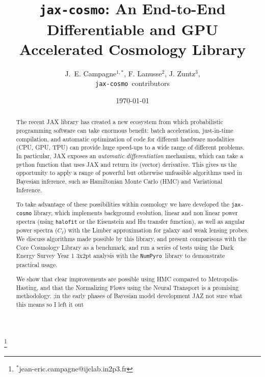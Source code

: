\documentclass[twocolumn,twocolappendix,nofootinbib]{openjournal}
\newcommand{\numpyro}{\texttt{NumPyro}}
\newcommand{\jaxcosmo}{\texttt{jax-cosmo}}
\begin{document}


\title{\jaxcosmo: An End-to-End Differentiable and GPU Accelerated Cosmology Library}


\author{
J.~E. Campagne$^{1,\ast}$, 
F. Lanusse$^2$, 
J. Zuntz$^3$,\\
\jaxcosmo\ contributors}
\thanks{$^\ast$jean-eric.campagne@ijclab.in2p3.fr}


\date{\today}

\begin{abstract}
The recent JAX library has created a new ecosystem from which probabilistic programming software can take enormous benefit: batch acceleration, just-in-time compilation, and automatic optimization of code for different hardware modalities (CPU, GPU, TPU) can provide huge speed-ups to a wide range of different problems. In particular, JAX exposes an \textit{automatic differentiation} mechanism, which can take a python function that uses JAX and return its (vector) derivative.  This gives us the opportunity to apply a range of powerful but otherwise unfeasible algorithms used in Bayesian inference, such as Hamiltonian Monte Carlo (HMC) and Variational Inference. 

To take advantage of these possibilities within cosmology we have developed the \texttt{jax-cosmo} library, which implements background evolution, linear and non linear power spectra (using \texttt{halofit} or the Eisenstein and Hu transfer function), as well as angular power spectra ($C_\ell$) with the Limber approximation for galaxy and weak lensing probes. We discuss algorithms made possible by this library, and present comparisons with the Core Cosmology Library as a benchmark, and run a series of tests using the Dark Energy Survey Year 1 3x2pt analysis with the \numpyro\ library to demonstrate practical usage. 

We show that clear improvements are possible using HMC compared to Metropolis-Hasting, and that the Normalizing Flows using the Neural Transport is a promising methodology.
;in the early phases of Bayesian model development JAZ not sure what this means so I left it out

\end{abstract}
\end{document}
